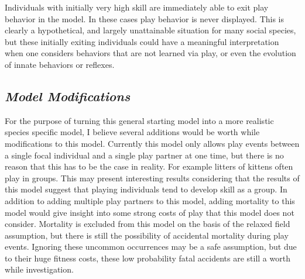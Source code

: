 \documentclass[12pt,letterpaper]{article}
\begin{document}
      Individuals with initially very high skill are immediately able to exit play behavior in the model. 
      In these cases play behavior is never displayed.
      This is clearly a hypothetical, and largely unattainable situation for many social species, but these initially exiting individuals could have a meaningful interpretation when one considers behaviors that are not learned via play, or even the evolution of innate behaviors or reflexes. %

  
  \subsection{\it Model Modifications}
      For the purpose of turning this general starting model into a more realistic species specific model, I believe several additions would be worth while modifications to this model. %
      Currently this model only allows play events between a single focal individual and a single play partner at one time, but there is no reason that this has to be the case in reality.
      For example litters of kittens often play in groups.
      This may present interesting results considering that the results of this model suggest that playing individuals tend to develop skill as a group. %
      In addition to adding multiple play partners to this model, adding mortality to this model would give insight into some strong costs of play that this model does not consider. %
      Mortality is excluded from this model on the basis of the relaxed field assumption, but there is still the possibility of accidental mortality during play events.
      Ignoring these uncommon occurrences may be a safe assumption, but due to their huge fitness costs, these low probability fatal accidents are still a worth while investigation.
    
\end{document}
